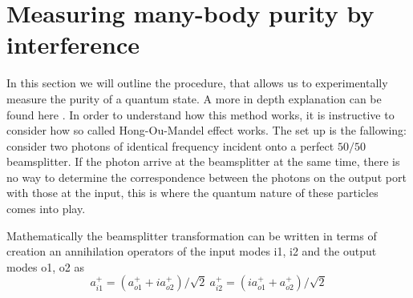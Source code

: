  \section{Measuring many-body purity by interference}
In this section we will outline the procedure, that allows us to experimentally measure the purity of a quantum state. A more in depth explanation can be found here \cite{preiss thesis}. In order to understand how this method works, it is instructive to consider how so called Hong-Ou-Mandel effect works. The set up is the fallowing: consider two photons of identical frequency incident onto a perfect $50/50$ beamsplitter. If the photon arrive at the beamsplitter at the same time, there is no way to determine the correspondence between the photons on the output port with those at the input, this is where the quantum nature of these particles comes into play. 

Mathematically the beamsplitter transformation can be written in terms of creation an annihilation operators of the input modes i1, i2 and the output modes o1, o2 as
\begin{equation}
a_{i1}^+ = (a_{o1}^+ +ia_{o2}^+ )/\sqrt{2}
\
a_{i2}^+ = (ia_{o1}^+ +a_{o2}^+ )/\sqrt{2}
\end{equation}